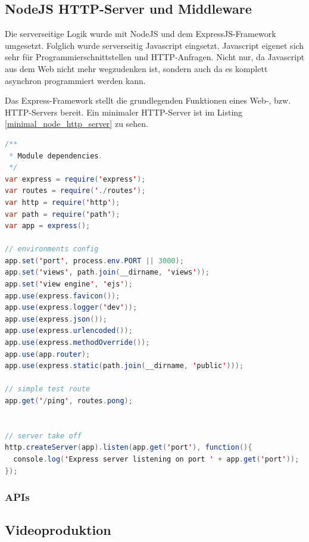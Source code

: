\subsection{NodeJS HTTP-Server und Middleware}
Die serverseitige Logik wurde mit NodeJS und dem ExpressJS-Framework umgesetzt. Folglich wurde serverseitig Javascript eingsetzt. Javascript eigenet sich sehr für Programmierschnittstellen und HTTP-Anfragen. Nicht nur, da Javascript aus dem Web nicht mehr wegzudenken ist, sondern auch da es komplett asynchron programmiert werden kann. 

Das Express-Framework stellt die grundlegenden Funktionen eines Web-, bzw. HTTP-Servers bereit. Ein minimaler HTTP-Server ist im Listing \ref{minimal_node_http_server} zu sehen. 

\begin{lstlisting}[label=minimal_node_http_server,language=Java, caption=Minimaler Node-HTTP-Server]
/**
 * Module dependencies.
 */
var express = require('express');
var routes = require('./routes');
var http = require('http');
var path = require('path');
var app = express();

// environments config
app.set('port', process.env.PORT || 3000);
app.set('views', path.join(__dirname, 'views'));
app.set('view engine', 'ejs');
app.use(express.favicon());
app.use(express.logger('dev'));
app.use(express.json());
app.use(express.urlencoded());
app.use(express.methodOverride());
app.use(app.router);
app.use(express.static(path.join(__dirname, 'public')));

// simple test route
app.get('/ping', routes.pong);


// server take off
http.createServer(app).listen(app.get('port'), function(){
  console.log('Express server listening on port ' + app.get('port'));
});
\end{lstlisting}

\subsubsection{APIs}

\subsection{Videoproduktion}
